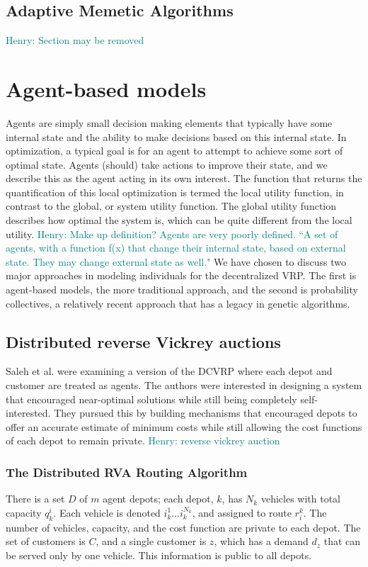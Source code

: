 \documentclass{sig-alternate}
\newcommand{\allcomments}[1]{{#1}}
\newcommand{\hfcomment}[1]{\textcolor{Teal}{\allcomments{Henry: {#1}}}}
\begin{document}
\subsection{Adaptive Memetic Algorithms}
\hfcomment{Section may be removed}

\section{Agent-based models}
Agents are simply small decision making elements that typically have some internal state and the ability to make decisions based on this internal state. In optimization, a typical goal is for an agent to attempt to achieve some sort of optimal state. Agents (should) take actions to improve their state, and we describe this as the agent acting in its own interest. The function that returns the quantification of this local optimization is termed the local utility function, in contrast to the global, or system utility function. The global utility function describes how optimal the system is, which can be quite different from the local utility. 
\hfcomment{Make up definition? Agents are very poorly defined. ``A set of agents, with a function f(x) that change their internal state, based on external state. They may change external state as well."}
We have chosen to discuss two major approaches in modeling individuals for the decentralized VRP. The first is agent-based models, the more traditional approach, and the second is probability collectives, a relatively recent approach that has a legacy in genetic algorithms.

\subsection{Distributed reverse Vickrey auctions}

Saleh et al.\cite{Saleh:2012} were examining a version of the DCVRP where each depot and customer are treated as agents. The authors were interested in designing a system that encouraged near-optimal solutions while still being completely self-interested. They pursued this by building mechanisms that encouraged depots to offer an accurate estimate of minimum costs while still allowing the cost functions of each depot to remain private. \hfcomment{reverse vickrey auction}

\subsubsection{The Distributed RVA Routing Algorithm}
There is a set $D$ of $m$ agent depots; each depot, $k$, has $N_k$ vehicles with total capacity $q_k^i$. Each vehicle is denoted $i_k^1 ... i_k^{N_k}$, and assigned to route $r_i^k$. The number of vehicles, capacity, and the cost function are private to each depot. The set of customers is $C$, and a single customer is $z$, which has a demand $d_z$ that can be served only by one vehicle. This information is public to all depots.
\end{document}
